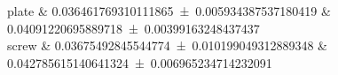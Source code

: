 plate 		&		\num{0.036461769310111865 \pm 0.005934387537180419} 		&		\num{0.04091220695889718 \pm 0.00399163248437437}	 \\ 
screw 		&		\num{0.03675492845544774 \pm 0.010199049312889348} 		&		\num{0.042785615140641324 \pm 0.006965234714232091}	 \\ 
